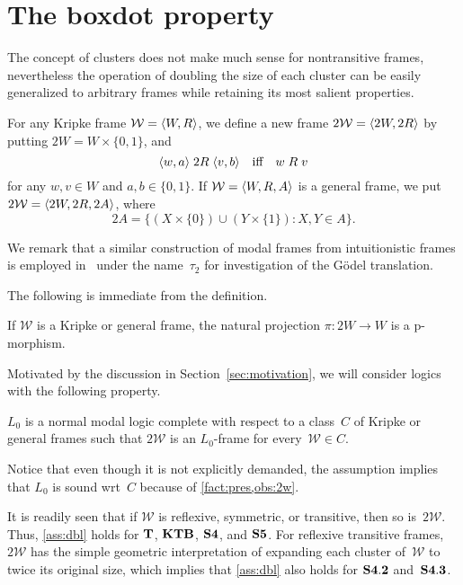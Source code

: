 \documentclass[leqno,draft,11pt]{article}
\let\frm\mathcal
\begin{document}
\section{The boxdot property}\label{sec:main-result}
The concept of clusters does not make much sense for nontransitive
frames, nevertheless the operation of doubling the size of each
cluster can be easily generalized to arbitrary frames while retaining
its most salient properties.
\begin{Def}\th\label{def:dbl}
For any Kripke frame $\frm W=\p{W,R}$, we define a new frame $2\frm W=\p{2W,2R}$ by putting $2W=W\times\{0,1\}$, and
\[\langle w,a\rangle\mathrel{2R}\langle v,b\rangle\quad\text{iff}\quad w\mathrel Rv\]
for any $w,v\in W$ and $a,b\in\{0,1\}$.
If $\frm W=\p{W,R,A}$ is a general frame, we put $2\frm
W=\p{2W,2R,2A}$, where
\[2A=\bigl\{(X\times\{0\})\cup(Y\times\{1\}):X,Y\in A\bigr\}.\]
\end{Def} 
We remark that a similar construction of modal frames from
intuitionistic frames is employed in~\cite{cha-zax}
under the name~$\tau_2$ for investigation of the G\"odel translation.

The following is immediate from the definition.
\begin{Obs}\th\label{obs:2w}
If $\frm W$ is a Kripke or general frame, the natural projection
$\pi\colon2W\to W$ is a p-morphism.
\noproof\end{Obs}
Motivated by the discussion in Section~\ref{sec:motivation}, we will
consider logics with the following property.
\begin{Ass}\th\label{ass:dbl}
$L_0$ is a normal modal logic complete with respect to a class~$C$ of Kripke
or general frames such that $2\frm W$ is an $L_0$-frame for
every~$\frm W\in C$.
\end{Ass}
Notice that even though it is not explicitly demanded, the assumption
implies that $L_0$ is
sound wrt~$C$ because of \th\ref{fact:pres,obs:2w}.
\begin{Exm}\th\label{exm:ass}
It is readily seen that if $\frm W$ is reflexive, symmetric, or
transitive, then so is~$2\frm W$. Thus, \th\ref{ass:dbl} holds for
$\mathbf T$, $\mathbf{KTB}$, $\mathbf{S4}$, and $\mathbf{S5}$. For reflexive
transitive frames, $2\frm W$ has the simple geometric interpretation
of expanding each cluster of~$\frm W$ to twice its original size, which implies that
\th\ref{ass:dbl} also holds for $\mathbf{S4.2}$ and~$\mathbf{S4.3}$.
\end{Exm}
\end{document}
